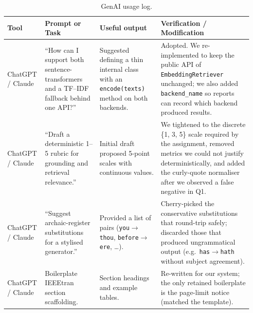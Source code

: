 \documentclass[10pt,twocolumn,a4paper]{article}
\begin{document}
\begin{table}[h]
\centering
\caption{GenAI usage log.}
\label{tab:genai-log}
\begin{tabularx}{\textwidth}{p{2.2cm} p{3.0cm} p{3.4cm} X}
\toprule
Tool & Prompt or Task & Useful output & Verification / Modification \\
\midrule
ChatGPT / Claude
& ``How can I support both sentence-transformers and a TF--IDF fallback behind one API?''
& Suggested defining a thin internal class with an \texttt{encode(texts)} method on both backends.
& Adopted. We re-implemented to keep the public API of \texttt{EmbeddingRetriever} unchanged; we also added \texttt{backend\_name} so reports can record which backend produced results. \\
\midrule
ChatGPT / Claude
& ``Draft a deterministic 1--5 rubric for grounding and retrieval relevance.''
& Initial draft proposed 5-point scales with continuous values.
& We tightened to the discrete \{1, 3, 5\} scale required by the assignment, removed metrics we could not justify deterministically, and added the curly-quote normaliser after we observed a false negative in Q1. \\
\midrule
ChatGPT / Claude
& ``Suggest archaic-register substitutions for a stylised generator.''
& Provided a list of pairs (\texttt{you}$\to$\texttt{thou}, \texttt{before}$\to$\texttt{ere}, \ldots).
& Cherry-picked the conservative substitutions that round-trip safely; discarded those that produced ungrammatical output (e.g.\ \texttt{has}$\to$\texttt{hath} without subject agreement). \\
\midrule
ChatGPT / Claude
& Boilerplate IEEEtran section scaffolding.
& Section headings and example tables.
& Re-written for our system; the only retained boilerplate is the page-limit notice (matched the template). \\
\bottomrule
\end{tabularx}
\end{table}
\end{document}
